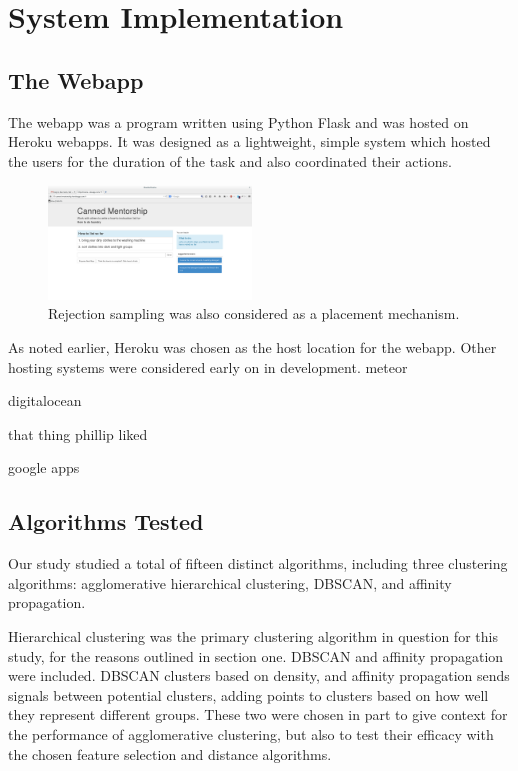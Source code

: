 \section{System Implementation}

\subsection{The Webapp}
The webapp was a program written using Python Flask and was hosted on Heroku webapps. 
It was designed as a lightweight, simple system which hosted the users for the duration of the task and also coordinated their actions.

\begin{figure}[h]
	\begin{center}
		\includegraphics[width=0.48\textwidth]{figures/cmInterface.png}
		\caption{Rejection sampling was also considered as a placement mechanism.}
		\label{fig:rejection_sampling_placement}
	\end{center}
\end{figure}

As noted earlier, Heroku was chosen as the host location for the webapp.
Other hosting systems were considered early on in development. 
meteor

digitalocean

that thing phillip liked

google apps


\subsection{Algorithms Tested}
Our study studied a total of fifteen distinct algorithms, including three clustering algorithms: agglomerative hierarchical clustering, DBSCAN, and affinity propagation.

Hierarchical clustering was the primary clustering algorithm in question for this study, for the reasons outlined in section one.
DBSCAN and affinity propagation were included.
DBSCAN clusters based on density, and affinity propagation sends signals between potential clusters, adding points to clusters based on how well they represent different groups.
 These two were chosen in part to give context for the performance of agglomerative clustering, but also to test their efficacy with the chosen feature selection and distance algorithms.

